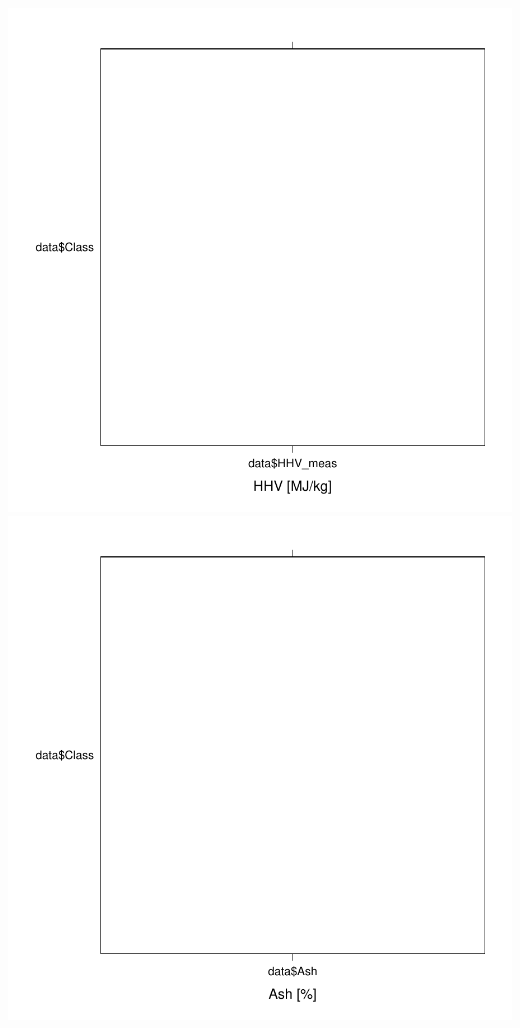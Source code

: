 \documentclass[a4paper]{article}
\begin{document}
\\
\includegraphics{images/img-004}
\\
\includegraphics{images/img-005}
\\
\end{document}
